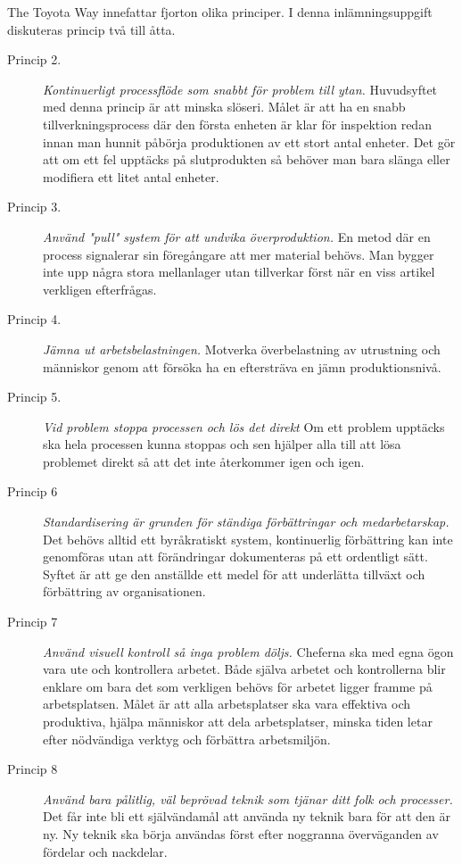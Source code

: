 \documentclass{article}
\begin{document}
The Toyota Way innefattar fjorton olika principer. I denna inlämningsuppgift diskuteras princip två till åtta.
\begin{description}
\item[Princip 2.]
\emph{Kontinuerligt processflöde som snabbt för problem till ytan.} Huvudsyftet med denna princip är att minska slöseri. Målet är att ha en snabb tillverkningsprocess där den första enheten är klar för inspektion redan innan man hunnit påbörja produktionen av ett stort antal enheter. Det gör att om ett fel upptäcks på slutprodukten så behöver man bara slänga eller modifiera ett litet antal enheter.
\item[Princip 3.]
\emph{Använd "pull" system för att undvika överproduktion.}
En metod där en process signalerar sin föregångare att mer material behövs. Man bygger inte upp några stora mellanlager utan tillverkar först när en viss artikel verkligen efterfrågas.
\item[Princip 4.]
\emph{Jämna ut arbetsbelastningen.}
Motverka överbelastning av utrustning och människor genom att försöka ha en eftersträva en jämn produktionsnivå.
\item[Princip 5.]
\emph{Vid problem stoppa processen och lös det direkt}
Om ett problem upptäcks ska hela processen kunna stoppas och sen hjälper alla till att lösa problemet direkt så att det inte återkommer igen och igen. 
\item[Princip 6]
\emph{Standardisering är grunden för ständiga förbättringar och medarbetarskap.}
Det behövs alltid ett byråkratiskt system, kontinuerlig förbättring kan inte genomföras utan att förändringar dokumenteras på ett ordentligt sätt. Syftet är att ge den anställde ett medel för att underlätta tillväxt och förbättring av organisationen.
\item[Princip 7]
\emph{Använd visuell kontroll så inga problem döljs.} Cheferna ska med egna ögon vara ute och kontrollera arbetet. Både själva arbetet och kontrollerna blir enklare om bara det som verkligen behövs för arbetet ligger framme på arbetsplatsen. Målet är att alla arbetsplatser ska vara effektiva och produktiva, hjälpa människor att dela arbetsplatser, minska tiden letar efter nödvändiga verktyg och förbättra arbetsmiljön.
\item[Princip 8]
\emph{Använd bara pålitlig, väl beprövad teknik som tjänar ditt folk och processer.} Det får inte bli ett självändamål att använda ny teknik bara för att den är ny. Ny teknik ska börja användas först efter noggranna överväganden av fördelar och nackdelar.
\end{description}
\end{document}

